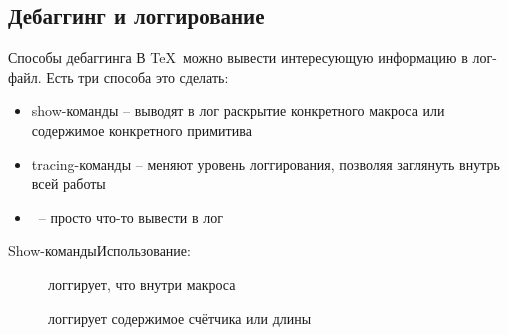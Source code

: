 \subsection{Дебаггинг и логгирование}
\begin{frame}{Способы дебаггинга}\relax
    В \TeX\ можно вывести интересующую информацию в лог-файл. Есть три способа это сделать:
    \begin{itemize}
        \item {\ccsc show-команды} -- выводят в лог раскрытие конкретного макроса или содержимое конкретного примитива 
        \item {\ccsc tracing-команды} -- меняют уровень логгирования, позволяя заглянуть внутрь всей работы
        \item \ccol\message\ -- просто что-то вывести в лог         
    \end{itemize}
     
\end{frame}
\begin{frame}{Show-команды\magicPage}{Использование: \ccol\show\ccol\macros}\relax
    \small
    \begin{description}
        \item[\ccol{\show}] логгирует, что внутри макроса
        \item[\ccol\showthe] логгирует содержимое счётчика или длины 
    \end{description}
\end{frame}
